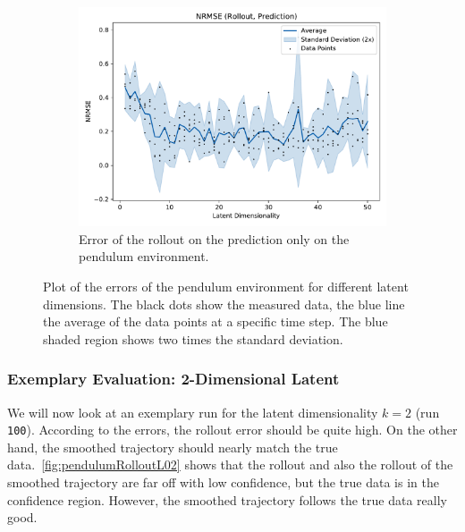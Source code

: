 \begin{figure}
\begin{subfigure}{0.5\linewidth}
					\label{fig:pendulumRmseTrain}
				\end{subfigure}%
				~
				\begin{subfigure}{0.5\linewidth}
					\centering
					\includegraphics[width=\linewidth]{figures/results/pendulum/latent-dim/comparison-rmse-rollout-prediction-normalized-mean-vs-latent-dim.pdf}
					\caption{Error of the rollout on the prediction only on the pendulum environment.}
					\label{fig:pendulumRmsePred}
				\end{subfigure}
				\caption{Plot of the errors of the pendulum environment for different latent dimensions. The black dots show the measured data, the blue line the average of the data points at a specific time step. The blue shaded region shows two times the standard deviation.}
				\label{fig:pendulumRmse}
			\end{figure}

		\subsubsection{Exemplary Evaluation: 2-Dimensional Latent}
			We will now look at an exemplary run for the latent dimensionality \( k = 2 \) (run \texttt{100}). According to the errors, the rollout error should be quite high. On the other hand, the smoothed trajectory should nearly match the true data.~\autoref{fig:pendulumRolloutL02} shows that the rollout and also the rollout of the smoothed trajectory are far off with low confidence, but the true data is in the confidence region. However, the smoothed trajectory follows the true data really good.

